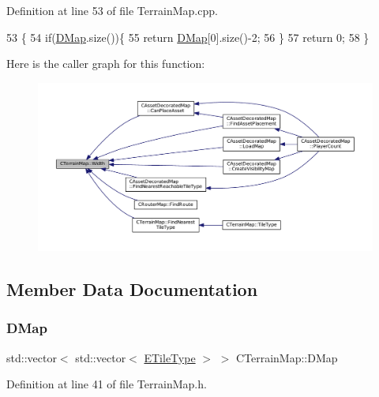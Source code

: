 Definition at line 53 of file Terrain\+Map.\+cpp.


\begin{DoxyCode}
53                             \{
54     \textcolor{keywordflow}{if}(\hyperlink{classCTerrainMap_a80d154ce478948b10473534a7bca13f6}{DMap}.size())\{
55         \textcolor{keywordflow}{return} \hyperlink{classCTerrainMap_a80d154ce478948b10473534a7bca13f6}{DMap}[0].size()-2;
56     \}
57     \textcolor{keywordflow}{return} 0;
58 \}
\end{DoxyCode}
Here is the caller graph for this function\+:\nopagebreak
\begin{figure}[H]
\begin{center}
\leavevmode
\includegraphics[width=350pt]{classCTerrainMap_a34cb754aa9b26e85a73377159f2527d7_icgraph}
\end{center}
\end{figure}


\subsection{Member Data Documentation}
\hypertarget{classCTerrainMap_a80d154ce478948b10473534a7bca13f6}{}\label{classCTerrainMap_a80d154ce478948b10473534a7bca13f6} 
\subsubsection{\texorpdfstring{D\+Map}{DMap}}
{\footnotesize\ttfamily std\+::vector$<$ std\+::vector$<$ \hyperlink{classCTerrainMap_aff2ab991e237269941416dd79d8871d4}{E\+Tile\+Type} $>$ $>$ C\+Terrain\+Map\+::\+D\+Map\hspace{0.3cm}{\ttfamily [protected]}}



Definition at line 41 of file Terrain\+Map.\+h.


